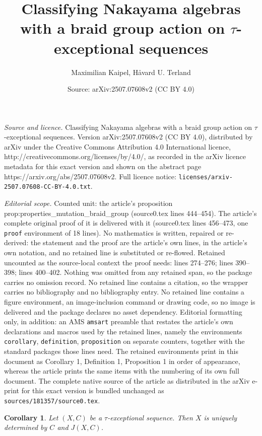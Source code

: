 \documentclass[10pt,a4paper]{amsart}
\title{Classifying Nakayama algebras with a braid group action on $\tau$-exceptional sequences}
\author{Maximilian Kaipel, Håvard U. Terland}
\date{Source: arXiv:2507.07608v2 (CC BY 4.0)}
\newtheorem{corollary}{Corollary}
\begin{document}
\maketitle

\noindent\emph{Source and licence.} Classifying Nakayama algebras with a braid group action on $\tau$-exceptional sequences. Version arXiv:2507.07608v2 (CC BY 4.0), distributed by arXiv under the Creative Commons Attribution 4.0 International licence, http://creativecommons.org/licenses/by/4.0/, as recorded in the arXiv licence metadata for this exact version and shown on the abstract page https://arxiv.org/abs/2507.07608v2. Full licence notice: \texttt{licenses/arxiv-2507.07608-CC-BY-4.0.txt}.\par\smallskip

\noindent\textit{Editorial scope.} Counted unit: the article's proposition prop:properties\_mutation\_braid\_group (source0.tex lines 444--454). The article's complete original proof of it is delivered with it (source0.tex lines 456--473, one \texttt{proof} environment of 18 lines). No mathematics is written, repaired or re-derived: the statement and the proof are the article's own lines, in the article's own notation, and no retained line is substituted or re-flowed.  Retained uncounted as the source-local context the proof needs: lines 274--276; lines 390--398; lines 400--402.  Nothing was omitted from any retained span, so the package carries no omission record.  No retained line contains a citation, so the wrapper carries no bibliography and no bibliography entry.  No retained line contains a figure environment, an image-inclusion command or drawing code, so no image is delivered and the package declares no asset dependency.  Editorial formatting only, in addition: an AMS \texttt{amsart} preamble that restates the article's own declarations and macros used by the retained lines, namely the environments \texttt{corollary}, \texttt{definition}, \texttt{proposition} on separate counters, together with the standard packages those lines need.  The retained environments print in this document as Corollary 1, Definition 1, Proposition 1 in order of appearance, whereas the article prints the same items with the numbering of its own full document.  The complete native source of the article as distributed in the arXiv e-print for this exact version is bundled unchanged as \texttt{sources/181357/source0.tex}.
\begin{corollary}\label{cor:tau_uniqueness_jasso_preserve}
   Let $(X,C)$ be a $\tau$-exceptional sequence. Then $X$ is uniquely determined by $C$ and $J(X,C)$.
\end{corollary}
\end{document}
